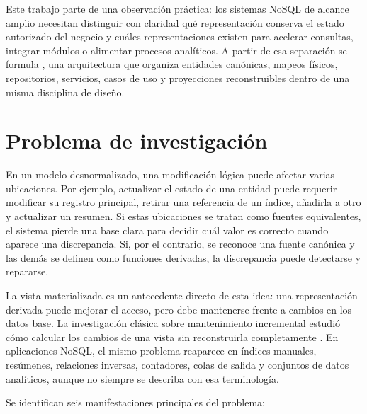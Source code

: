 Este trabajo parte de una observación práctica: los sistemas NoSQL de alcance amplio
necesitan distinguir con claridad qué representación conserva el estado autorizado del
negocio y cuáles representaciones existen para acelerar consultas, integrar módulos o
alimentar procesos analíticos. A partir de esa separación se formula \COBRIA{}, una
arquitectura que organiza entidades canónicas, mapeos físicos, repositorios, servicios,
casos de uso y proyecciones reconstruibles dentro de una misma disciplina de diseño.

\section{Problema de investigación}

En un modelo desnormalizado, una modificación lógica puede afectar varias ubicaciones.
Por ejemplo, actualizar el estado de una entidad puede requerir modificar su registro
principal, retirar una referencia de un índice, añadirla a otro y actualizar un resumen.
Si estas ubicaciones se tratan como fuentes equivalentes, el sistema pierde una base
clara para decidir cuál valor es correcto cuando aparece una discrepancia. Si, por el
contrario, se reconoce una fuente canónica y las demás se definen como funciones
derivadas, la discrepancia puede detectarse y repararse.

La vista materializada es un antecedente directo de esta idea: una representación
derivada puede mejorar el acceso, pero debe mantenerse frente a cambios en los datos
base. La investigación clásica sobre mantenimiento incremental estudió cómo calcular
los cambios de una vista sin reconstruirla completamente
\parencite{gupta1993incremental,gupta1995materialized}. En aplicaciones NoSQL, el mismo
problema reaparece en índices manuales, resúmenes, relaciones inversas, contadores,
colas de salida y conjuntos de datos analíticos, aunque no siempre se describa con esa
terminología.

Se identifican seis manifestaciones principales del problema:

